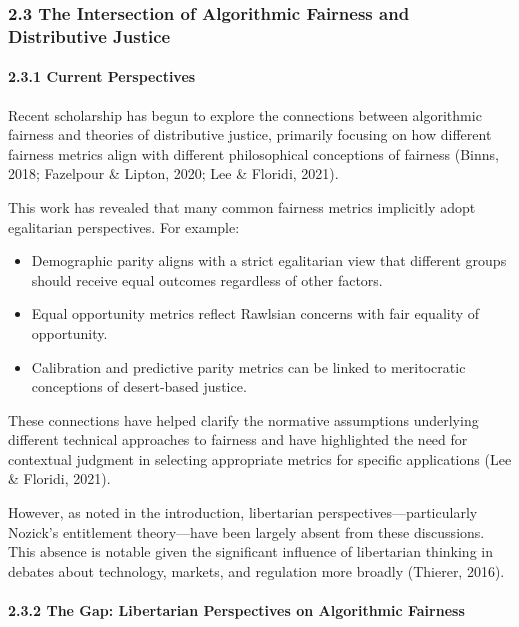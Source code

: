 \subsubsection{2.3 The Intersection of Algorithmic Fairness and
Distributive
Justice}\label{the-intersection-of-algorithmic-fairness-and-distributive-justice}

\paragraph{2.3.1 Current Perspectives}\label{current-perspectives}

Recent scholarship has begun to explore the connections between
algorithmic fairness and theories of distributive justice, primarily
focusing on how different fairness metrics align with different
philosophical conceptions of fairness (Binns, 2018; Fazelpour \& Lipton,
2020; Lee \& Floridi, 2021).

This work has revealed that many common fairness metrics implicitly
adopt egalitarian perspectives. For example:

\begin{itemize}
\tightlist
\item
  Demographic parity aligns with a strict egalitarian view that
  different groups should receive equal outcomes regardless of other
  factors.
\item
  Equal opportunity metrics reflect Rawlsian concerns with fair equality
  of opportunity.
\item
  Calibration and predictive parity metrics can be linked to
  meritocratic conceptions of desert-based justice.
\end{itemize}

These connections have helped clarify the normative assumptions
underlying different technical approaches to fairness and have
highlighted the need for contextual judgment in selecting appropriate
metrics for specific applications (Lee \& Floridi, 2021).

However, as noted in the introduction, libertarian
perspectives---particularly Nozick's entitlement theory---have been
largely absent from these discussions. This absence is notable given the
significant influence of libertarian thinking in debates about
technology, markets, and regulation more broadly (Thierer, 2016).

\paragraph{2.3.2 The Gap: Libertarian Perspectives on Algorithmic
Fairness}\label{the-gap-libertarian-perspectives-on-algorithmic-fairness}

